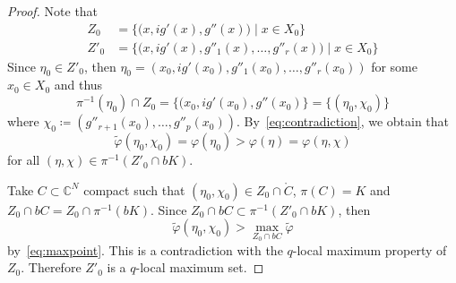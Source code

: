 \documentclass[10pt,a4paper]{amsart}
\newcommand{\C}{\numberset{C}}
\newcommand{\numberset}{\mathbb}
\renewcommand{\phi}{\varphi}
\begin{document}
\begin{proof}
    Note that
    \begin{align*}
        Z_0 &= \bigl\{\bigl(x,ig'(x),g''(x)\bigr) \mid x\in X_0\bigr\} \\
        Z'_0 &= \bigl\{\bigl(x,ig'(x),g''_1(x),\dots,g''_r(x)\bigr) \mid x\in X_0\bigr\}
    \end{align*}
    Since $\eta_0\in Z'_0$, then $\eta_0=(x_0,ig'(x_0),g''_1(x_0),\dots,g''_r(x_0))$ for some $x_0\in X_0$ and thus
    \[
        \pi^{-1}(\eta_0)\cap Z_0=\{(x_0,ig'(x_0),g''(x_0)\}=\{(\eta_0,\chi_0)\}
    \]
    where $\chi_0\coloneqq(g''_{r+1}(x_0),\dots,g''_p(x_0))$. By~\eqref{eq:contradiction}, we obtain that
    \begin{equation}
    \label{eq:maxpoint}
        \tilde\phi(\eta_0,\chi_0)=\phi(\eta_0)>\phi(\eta)=\phi(\eta,\chi)
    \end{equation}
    for all $(\eta,\chi)\in\pi^{-1}(Z'_0\cap bK)$.

    Take $C\subset\C^N$ compact such that $(\eta_0,\chi_0)\in Z_0\cap\mathring{C}$, $\pi(C)=K$ and $Z_0\cap bC= Z_0\cap\pi^{-1}(bK)$. Since $Z_0\cap bC\subset\pi^{-1}(Z'_0\cap bK)$, then
    \[
        \tilde\phi(\eta_0,\chi_0)>\max_{Z_0\cap bC}\tilde\phi
    \]
    by~\eqref{eq:maxpoint}. This is a contradiction with the $q$-local maximum property of $Z_0$. Therefore $Z'_0$ is a $q$-local maximum set.
\end{proof}
\end{document}
